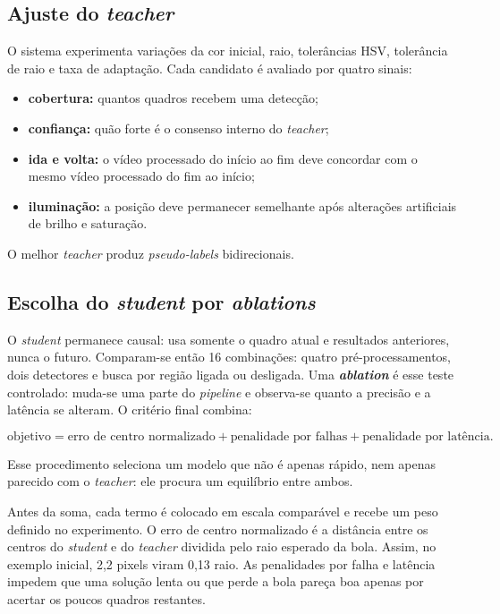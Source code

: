 \documentclass[11pt,a4paper]{article}
\begin{document}
\subsection{Ajuste do \textit{teacher}}

O sistema experimenta variações da cor inicial, raio, tolerâncias HSV, tolerância de raio e
taxa de adaptação. Cada candidato é avaliado por quatro sinais:

\begin{itemize}
  \item \textbf{cobertura:} quantos quadros recebem uma detecção;
  \item \textbf{confiança:} quão forte é o consenso interno do \textit{teacher};
  \item \textbf{ida e volta:} o vídeo processado do início ao fim deve concordar com o mesmo
  vídeo processado do fim ao início;
  \item \textbf{iluminação:} a posição deve permanecer semelhante após alterações artificiais
  de brilho e saturação.
\end{itemize}

O melhor \textit{teacher} produz \textit{pseudo-labels} bidirecionais.

\subsection{Escolha do \textit{student} por \textit{ablations}}

O \textit{student} permanece causal: usa
somente o quadro atual e resultados anteriores, nunca o futuro. Comparam-se então 16
combinações: quatro pré-processamentos, dois detectores e busca por região ligada ou
desligada. Uma \textbf{\textit{ablation}} é esse teste controlado: muda-se uma parte do \textit{pipeline} e
observa-se quanto a precisão e a latência se alteram. O critério final combina:

\[
  \text{objetivo} = \text{erro de centro normalizado}
  + \text{penalidade por falhas}
  + \text{penalidade por latência}.
\]

Esse procedimento seleciona um modelo que não é apenas rápido, nem apenas parecido com o
\textit{teacher}: ele procura um equilíbrio entre ambos.

Antes da soma, cada termo é colocado em escala comparável e recebe um peso definido no
experimento. O erro de centro normalizado é a distância entre os centros do \textit{student}
e do \textit{teacher} dividida pelo raio esperado da bola. Assim, no exemplo inicial, 2,2 pixels viram
0,13 raio. As penalidades por falha e latência impedem que uma solução lenta ou que perde a
bola pareça boa apenas por acertar os poucos quadros restantes.
\end{document}
